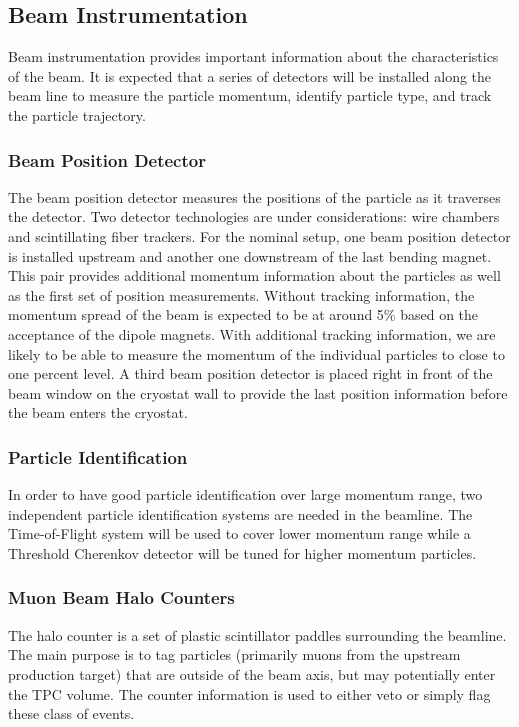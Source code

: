 
\subsection{Beam Instrumentation}
Beam instrumentation provides important information about the characteristics of the beam. It is expected that a series of detectors will be installed along the beam line to measure the particle momentum, identify particle type, and track the particle trajectory.

\subsubsection{Beam Position Detector}
The beam position detector measures the positions of the particle as it traverses the detector. Two detector technologies are under considerations: wire chambers and scintillating fiber trackers. For the nominal setup, one beam position detector is installed upstream and another one downstream of the last bending magnet. This pair provides additional momentum information about the particles as well as the first set of position measurements. Without tracking information, the momentum spread of the beam is expected to be at around 5\% based on the acceptance of the dipole magnets. With additional tracking information, we are likely to be able to measure the momentum of the individual particles to close to one percent level. A third beam position detector is placed right in front of the beam window on the cryostat wall to provide the last position information before the beam enters the cryostat.

\subsubsection{Particle Identification}
In order to have good particle identification over large momentum range, two independent particle identification systems are needed in the beamline. The Time-of-Flight system will be used to cover lower momentum range while a Threshold Cherenkov detector will be tuned for higher momentum particles.

\subsubsection{Muon Beam Halo Counters}
The halo counter is a set of plastic scintillator paddles surrounding the beamline. The main purpose is to tag particles (primarily muons from the upstream production target) that are outside of the beam axis, but may potentially enter the TPC volume. The counter information is used to either veto or simply flag these class of events.

